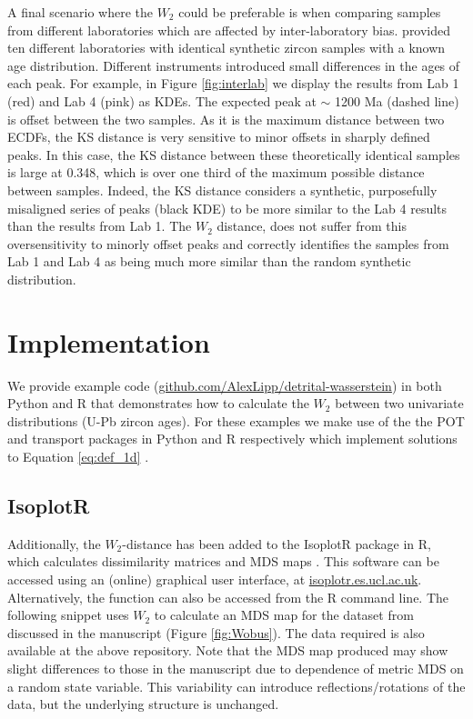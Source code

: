 \documentclass[gchron, manuscript]{article}
\begin{document}
A final scenario where the $W_2$ could be preferable is when comparing samples from different laboratories which are affected by inter-laboratory bias. \citet{kosler_u-pb_2013} provided ten different laboratories with identical synthetic zircon samples with a known age distribution. Different instruments introduced small differences in the ages of each peak. For example, in Figure \ref{fig:interlab} we display the results from Lab 1 (red) and Lab 4 (pink) as KDEs. The expected peak at $\sim$ 1200 Ma (dashed line) is offset between the two samples. As it is the maximum distance between two ECDFs, the KS distance is very sensitive to minor offsets in sharply defined peaks. In this case, the KS distance between these theoretically identical samples is large at 0.348, which is over one third of the maximum possible distance between samples. Indeed, the KS distance considers a synthetic, purposefully misaligned series of peaks (black KDE) to be more similar to the Lab 4 results than the results from Lab 1. The $W_2$ distance, does not suffer from this oversensitivity to minorly offset peaks and correctly identifies the samples from Lab 1 and Lab 4 as being much more similar than the random synthetic distribution.   

\section{Implementation} 

We provide example code (\href{https://github.com/AlexLipp/detrital-wasserstein}{\url{github.com/AlexLipp/detrital-wasserstein}}) in both Python and R that demonstrates how to calculate the $W_2$ between two univariate distributions (U-Pb zircon ages). For these examples we make use of the the {\sf POT} and {\sf transport} packages in Python and R respectively which implement solutions to Equation \ref{eq:def_1d} \citep{flamary_pot_2021,schuhmacher_transport_2022}.

\subsection{IsoplotR}

Additionally, the $W_2$-distance has been added to the IsoplotR package in R, which calculates dissimilarity matrices and MDS maps \citep{vermeesch_isoplotr_2018}. This software can  be accessed using an (online) graphical user interface, at \href{https://isoplotr.es.ucl.ac.uk/}{\url{isoplotr.es.ucl.ac.uk}}. Alternatively, the function can also be accessed from the R command line. The following snippet uses $W_2$ to calculate an MDS map for the dataset from \citet{wobus_has_2003} discussed in the manuscript (Figure \ref{fig:Wobus}). The data required is also available at the above repository. Note that the MDS map produced may show slight differences to those in the manuscript due to dependence of metric MDS on a random state variable. This variability can introduce reflections/rotations of the data, but the underlying structure is unchanged.
\end{document}
